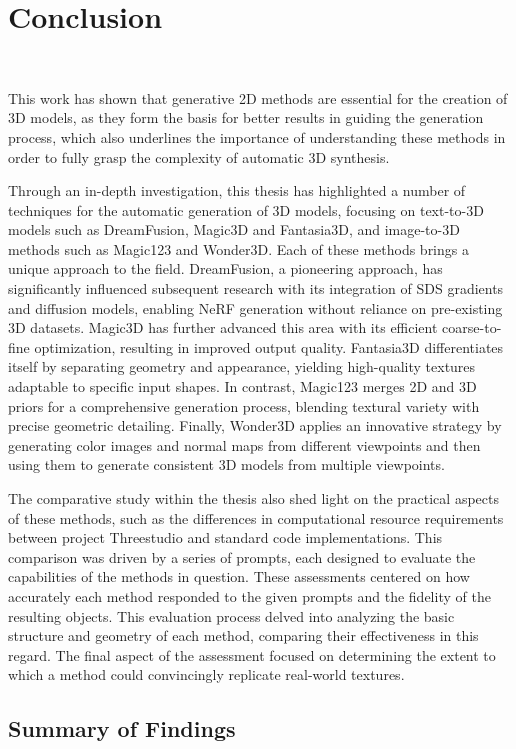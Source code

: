 \chapter{Conclusion}~\label{ch:conclusion}

This work has shown that generative 2D methods are essential for the creation of 3D models, as they form the basis for better results in guiding the generation process, which also underlines the importance of understanding these methods in order to fully grasp the complexity of automatic 3D synthesis.

Through an in-depth investigation, this thesis has highlighted a number of techniques for the automatic generation of 3D models, focusing on text-to-3D models such as DreamFusion, Magic3D and Fantasia3D, and image-to-3D methods such as Magic123 and Wonder3D. Each of these methods brings a unique approach to the field. DreamFusion, a pioneering approach, has significantly influenced subsequent research with its integration of SDS gradients and diffusion models, enabling NeRF generation without reliance on pre-existing 3D datasets. Magic3D has further advanced this area with its efficient coarse-to-fine optimization, resulting in improved output quality. Fantasia3D differentiates itself by separating geometry and appearance, yielding high-quality textures adaptable to specific input shapes. In contrast, Magic123 merges 2D and 3D priors for a comprehensive generation process, blending textural variety with precise geometric detailing. Finally, Wonder3D applies an innovative strategy by generating color images and normal maps from different viewpoints and then using them to generate consistent 3D models from multiple viewpoints.

The comparative study within the thesis also shed light on the practical aspects of these methods, such as the differences in computational resource requirements between project Threestudio and standard code implementations. This comparison was driven by a series of prompts, each designed to evaluate the capabilities of the methods in question. These assessments centered on how accurately each method responded to the given prompts and the fidelity of the resulting objects. This evaluation process delved into analyzing the basic structure and geometry of each method, comparing their effectiveness in this regard. The final aspect of the assessment focused on determining the extent to which a method could convincingly replicate real-world textures.

\section{Summary of Findings}

